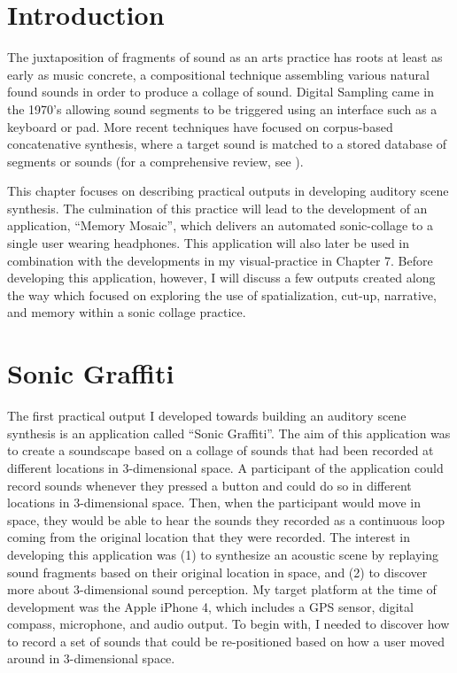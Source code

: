 \documentclass[a4paper,11pt,final]{ThesisStyle}
\begin{document}
\section{Introduction}

The juxtaposition of fragments of sound as an arts practice has roots at least as early as music concrete, a compositional technique assembling various natural found sounds in order to produce a collage of sound.  Digital Sampling came in the 1970's allowing sound segments to be triggered using an interface such as a keyboard or pad.  More recent techniques have focused on corpus-based concatenative synthesis, where a target sound is matched to a stored database of segments or sounds (for a comprehensive review, see \cite{Schwarz2006}).  

This chapter focuses on describing practical outputs in developing auditory scene synthesis.  The culmination of this practice will lead to the development of an application, ``Memory Mosaic'', which delivers an automated sonic-collage to a single user wearing headphones.  This application will also later be used in combination with the developments in my visual-practice in Chapter 7.   Before developing this application, however, I will discuss a few outputs created along the way which focused on exploring the use of spatialization, cut-up, narrative, and memory within a sonic collage practice.  

\section{Sonic Graffiti}

The first practical output I developed towards building an auditory scene synthesis is an application called ``Sonic Graffiti''.  The aim of this application was to create a soundscape based on a collage of sounds that had been recorded at different locations in 3-dimensional space.  A participant of the application could record sounds whenever they pressed a button and could do so in different locations in 3-dimensional space.  Then, when the participant would move in space, they would be able to hear the sounds they recorded as a continuous loop coming from the original location that they were recorded.  The interest in developing this application was (1) to synthesize an acoustic scene by replaying sound fragments based on their original location in space, and (2) to discover more about 3-dimensional sound perception.  My target platform at the time of development was the Apple iPhone 4, which includes a GPS sensor, digital compass, microphone, and audio output.  To begin with, I needed to discover how to record a set of sounds that could be re-positioned based on how a user moved around in 3-dimensional space.
\end{document}
